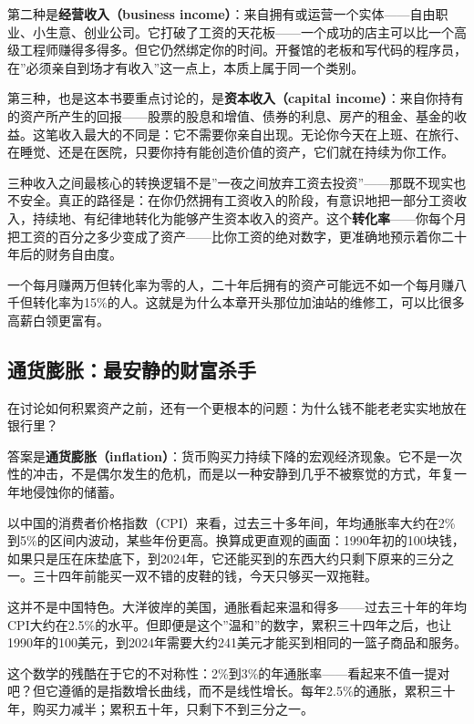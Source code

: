 \documentclass[a4paper,11pt,oneside,fontset=none,UTF8,zihao=-4]{ctexbook}
\begin{document}
第二种是\textbf{经营收入（business
income）}：来自拥有或运营一个实体------自由职业、小生意、创业公司。它打破了工资的天花板------一个成功的店主可以比一个高级工程师赚得多得多。但它仍然绑定你的时间。开餐馆的老板和写代码的程序员，在''必须亲自到场才有收入''这一点上，本质上属于同一个类别。

第三种，也是这本书要重点讨论的，是\textbf{资本收入（capital
income）}：来自你持有的资产所产生的回报------股票的股息和增值、债券的利息、房产的租金、基金的收益。这笔收入最大的不同是：它不需要你亲自出现。无论你今天在上班、在旅行、在睡觉、还是在医院，只要你持有能创造价值的资产，它们就在持续为你工作。

三种收入之间最核心的转换逻辑不是''一夜之间放弃工资去投资''------那既不现实也不安全。真正的路径是：在你仍然拥有工资收入的阶段，有意识地把一部分工资收入，持续地、有纪律地转化为能够产生资本收入的资产。这个\textbf{转化率}------你每个月把工资的百分之多少变成了资产------比你工资的绝对数字，更准确地预示着你二十年后的财务自由度。

一个每月赚两万但转化率为零的人，二十年后拥有的资产可能远不如一个每月赚八千但转化率为15\%的人。这就是为什么本章开头那位加油站的维修工，可以比很多高薪白领更富有。

\subsection{通货膨胀：最安静的财富杀手}\label{ux901aux8d27ux81a8ux80c0ux6700ux5b89ux9759ux7684ux8d22ux5bccux6740ux624b}

在讨论如何积累资产之前，还有一个更根本的问题：为什么钱不能老老实实地放在银行里？

答案是\textbf{通货膨胀（inflation）}：货币购买力持续下降的宏观经济现象。它不是一次性的冲击，不是偶尔发生的危机，而是以一种安静到几乎不被察觉的方式，年复一年地侵蚀你的储蓄。

以中国的消费者价格指数（CPI）来看，过去三十多年间，年均通胀率大约在2\%到5\%的区间内波动，某些年份更高。换算成更直观的画面：1990年初的100块钱，如果只是压在床垫底下，到2024年，它还能买到的东西大约只剩下原来的三分之一。三十四年前能买一双不错的皮鞋的钱，今天只够买一双拖鞋。

这并不是中国特色。大洋彼岸的美国，通胀看起来温和得多------过去三十年的年均CPI大约在2.5\%的水平。但即便是这个''温和''的数字，累积三十四年之后，也让1990年的100美元，到2024年需要大约241美元才能买到相同的一篮子商品和服务。

这个数学的残酷在于它的不对称性：2\%到3\%的年通胀率------看起来不值一提对吧？但它遵循的是指数增长曲线，而不是线性增长。每年2.5\%的通胀，累积三十年，购买力减半；累积五十年，只剩下不到三分之一。
\end{document}
